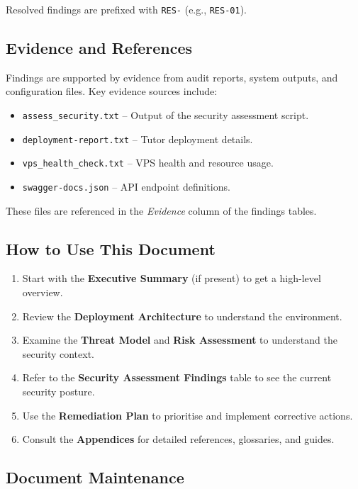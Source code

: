 Resolved findings are prefixed with \texttt{RES-} (e.g., \texttt{RES-01}).

\subsection*{Evidence and References}

Findings are supported by evidence from audit reports, system outputs, and configuration files. Key evidence sources include:
\begin{itemize}
    \item \texttt{assess\_security.txt} – Output of the security assessment script.
    \item \texttt{deployment-report.txt} – Tutor deployment details.
    \item \texttt{vps\_health\_check.txt} – VPS health and resource usage.
    \item \texttt{swagger-docs.json} – API endpoint definitions.
\end{itemize}

These files are referenced in the \textit{Evidence} column of the findings tables.

\subsection*{How to Use This Document}

\begin{enumerate}
    \item Start with the \textbf{Executive Summary} (if present) to get a high-level overview.
    \item Review the \textbf{Deployment Architecture} to understand the environment.
    \item Examine the \textbf{Threat Model} and \textbf{Risk Assessment} to understand the security context.
    \item Refer to the \textbf{Security Assessment Findings} table to see the current security posture.
    \item Use the \textbf{Remediation Plan} to prioritise and implement corrective actions.
    \item Consult the \textbf{Appendices} for detailed references, glossaries, and guides.
\end{enumerate}

\subsection*{Document Maintenance}

